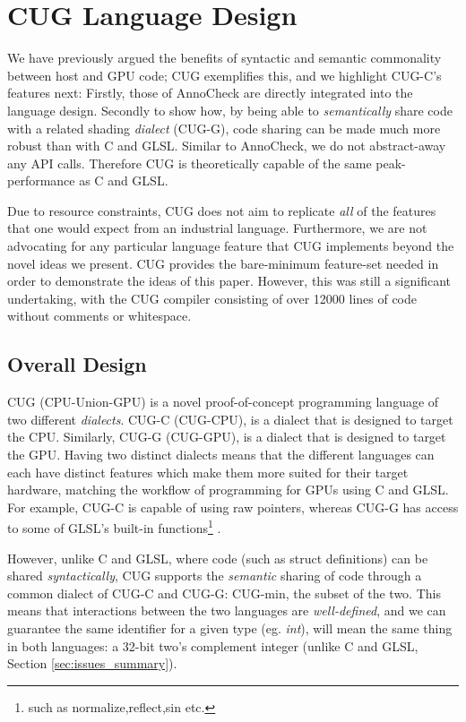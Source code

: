 \documentclass[a4paper,12pt,twoside,openright]{report}
\def\compilerloccount{12000 }
\begin{document}
\section{CUG Language Design}

\label{sec:design_languages}

We have previously argued the benefits of syntactic and semantic commonality
between host and GPU code; CUG exemplifies this, and we highlight CUG-C's
features next: Firstly, those of AnnoCheck are directly integrated into the
language design. Secondly to show how, by being able to \textit{semantically}
share code with a related shading \textit{dialect} (CUG-G), code sharing can be
made much more robust than with C and GLSL. Similar to AnnoCheck, we do not
abstract-away any API calls. Therefore CUG is theoretically capable of the same
peak-performance as C and GLSL.

Due to resource constraints, CUG does not aim to replicate \textit{all} of the
features that one would expect from an industrial language. Furthermore, we are
not advocating for any particular language feature that CUG implements beyond
the novel ideas we present. CUG provides the bare-minimum feature-set needed in
order to demonstrate the ideas of this paper. However, this was still a
significant undertaking, with the CUG compiler consisting of over
\compilerloccount lines of code without comments or whitespace.

\subsection{Overall Design}

CUG (CPU-Union-GPU) is a novel proof-of-concept programming language of two
different \textit{dialects}. CUG-C (CUG-CPU), is a dialect that is designed to
target the CPU. Similarly, CUG-G (CUG-GPU), is a dialect that is designed to
target the GPU. Having two distinct dialects means that the different languages
can each have distinct features which make them more suited for their target
hardware, matching the workflow of programming for GPUs using C and GLSL. For
example, CUG-C is capable of using raw pointers, whereas CUG-G has access to
some of GLSL's built-in functions\footnote{such as normalize,reflect,sin etc.}
\cite{GLSLBuiltIn}.

However, unlike C and GLSL, where code (such as struct definitions) can be
shared \textit{syntactically}, CUG supports the \textit{semantic} sharing of
code through a common dialect of CUG-C and CUG-G: CUG-min, the subset of the
two. This means that interactions between the two languages are
\textit{well-defined}, and we can guarantee the same identifier for a given
type (eg. \textit{int}), will mean the same thing in both languages: a 32-bit
two's complement integer (unlike C and GLSL, Section \ref{sec:issues_summary}).
\end{document}
